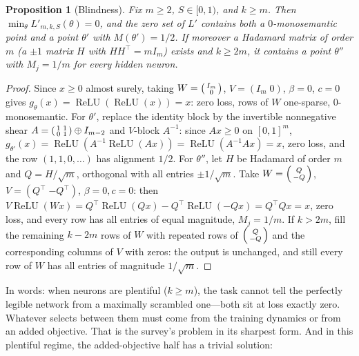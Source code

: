 \documentclass[11pt]{amsart}
\theoremstyle{plain}
\newtheorem{proposition}[theorem]{Proposition}
\theoremstyle{definition}
\DeclareMathOperator{\relu}{ReLU}
\begin{document}
\begin{proposition}[Blindness]\label{prop:blind}
Fix $m\ge2$, $S\in[0,1)$, and $k\ge m$. Then $\min_\theta L'_{m,k,S}(\theta)=0$, and the zero set of $L'$ contains both a $0$-monosemantic point and a point $\theta'$ with $M(\theta')=1/2$. If moreover a Hadamard matrix of order $m$ (a $\pm1$ matrix $H$ with $HH^{\top}=mI_m$) exists and $k\ge 2m$, it contains a point $\theta''$ with $M_j = 1/m$ for \emph{every} hidden neuron.
\end{proposition}

\begin{proof}
Since $x\ge0$ almost surely, taking $W=\begin{psmallmatrix}I_m\\0\end{psmallmatrix}$, $V=(I_m\;0)$, $\beta=0$, $c=0$ gives $g_\theta(x)=\relu(\relu(x))=x$: zero loss, rows of $W$ one-sparse, $0$-monosemantic. For $\theta'$, replace the identity block by the invertible nonnegative shear $A=\begin{psmallmatrix}1&1\\0&1\end{psmallmatrix}\oplus I_{m-2}$ and $V$-block $A^{-1}$: since $Ax\ge0$ on $[0,1]^m$, $g_{\theta'}(x)=\relu(A^{-1}\relu(Ax))=\relu(A^{-1}Ax)=x$, zero loss, and the row $(1,1,0,\dots)$ has alignment $1/2$. For $\theta''$, let $H$ be Hadamard of order $m$ and $Q=H/\sqrt m$, orthogonal with all entries $\pm1/\sqrt m$. Take $W=\begin{psmallmatrix}Q\\-Q\end{psmallmatrix}$, $V=(Q^{\top}\;{-Q^{\top}})$, $\beta=0,c=0$: then $V\relu(Wx)=Q^\top\relu(Qx)-Q^\top\relu(-Qx)=Q^{\top}Qx=x$, zero loss, and every row has all entries of equal magnitude, $M_j=1/m$. If $k>2m$, fill the remaining $k-2m$ rows of $W$ with repeated rows of $\begin{psmallmatrix}Q\\-Q\end{psmallmatrix}$ and the corresponding columns of $V$ with zeros: the output is unchanged, and still every row of $W$ has all entries of magnitude $1/\sqrt m$.
\end{proof}

In words: when neurons are plentiful ($k\ge m$), the task cannot tell the perfectly legible network from a maximally scrambled one---both sit at loss exactly zero. Whatever selects between them must come from the training dynamics or from an added objective. That is the survey's problem in its sharpest form. And in this plentiful regime, the added-objective half has a trivial solution:
\end{document}
